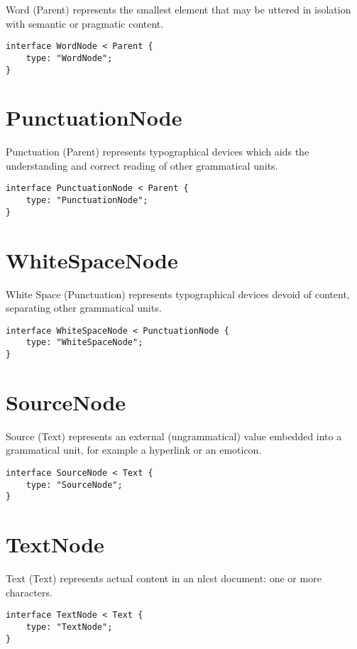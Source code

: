 Word (Parent) represents the smallest element that may be uttered in
isolation with semantic or pragmatic content.

\begin{lstlisting}
interface WordNode < Parent {
    type: "WordNode";
}
\end{lstlisting}

\section*{PunctuationNode}\label{punctuationnode}

Punctuation (Parent) represents typographical devices which aids the
understanding and correct reading of other grammatical units.

\begin{lstlisting}
interface PunctuationNode < Parent {
    type: "PunctuationNode";
}
\end{lstlisting}

\section*{WhiteSpaceNode}\label{whitespacenode}

White Space (Punctuation) represents typographical devices devoid of
content, separating other grammatical units.

\begin{lstlisting}
interface WhiteSpaceNode < PunctuationNode {
    type: "WhiteSpaceNode";
}
\end{lstlisting}

\section*{SourceNode}\label{sourcenode}

Source (Text) represents an external (ungrammatical) value embedded
into a grammatical unit, for example a hyperlink or an emoticon.

\begin{lstlisting}
interface SourceNode < Text {
    type: "SourceNode";
}
\end{lstlisting}

\section*{TextNode}\label{textnode}

Text (Text) represents actual content in an \gls{nlcst} document: one or more
characters.

\begin{lstlisting}
interface TextNode < Text {
    type: "TextNode";
}
\end{lstlisting}
